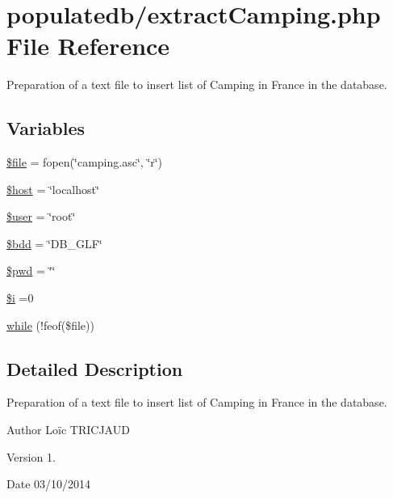 \hypertarget{extract_camping_8php}{\section{populatedb/extract\-Camping.php File Reference}
\label{extract_camping_8php}
}


Preparation of a text file to insert list of Camping in France in the database.  


\subsection*{Variables}
\begin{DoxyCompactItemize}
\item 
\hyperlink{extract_camping_8php_aa1bfbd27060176201b271918dff57e8f}{\$file} = fopen(\char`\"{}camping.\-asc\char`\"{}, \char`\"{}r\char`\"{})
\item 
\hyperlink{extract_camping_8php_a711797613cb863ca0756df789c396bf2}{\$host} = \char`\"{}localhost\char`\"{}
\item 
\hyperlink{extract_camping_8php_a598ca4e71b15a1313ec95f0df1027ca5}{\$user} = \char`\"{}root\char`\"{}
\item 
\hyperlink{extract_camping_8php_a94f91e878bce0991e2cd595c5dd79b3f}{\$bdd} = \char`\"{}D\-B\-\_\-\-G\-L\-F\char`\"{}
\item 
\hyperlink{extract_camping_8php_a12e4252e778952d356721bc655cff8c8}{\$pwd} = \char`\"{}\char`\"{}
\item 
\hyperlink{extract_camping_8php_a83018d9153d17d91fbcf3bc10158d34f}{\$i} =0
\item 
\hyperlink{extract_camping_8php_a4eebe21070c3a655a77e55ea3fe137f5}{while} (!feof(\$file))
\end{DoxyCompactItemize}


\subsection{Detailed Description}
Preparation of a text file to insert list of Camping in France in the database. \begin{DoxyAuthor}{Author}
Loïc T\-R\-I\-C\-J\-A\-U\-D 
\end{DoxyAuthor}
\begin{DoxyVersion}{Version}
1. 
\end{DoxyVersion}
\begin{DoxyDate}{Date}
03/10/2014 
\end{DoxyDate}


